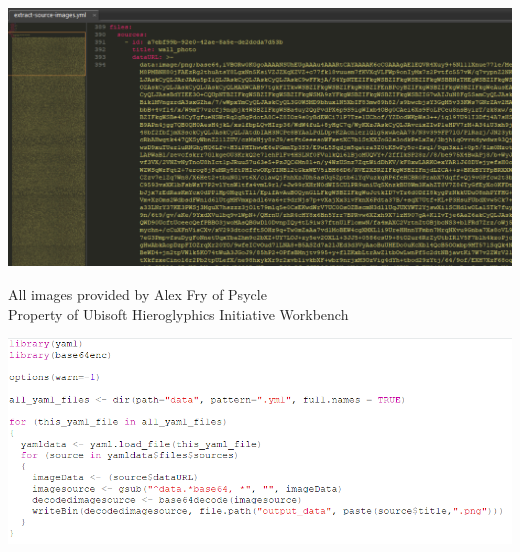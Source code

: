 \documentclass[unknownkeysallowed,usepdftitle=false, parskip=full]{beamer}
\newcommand{\secvariable}{nothing}
\newcommand{\mysection}[1]{\renewcommand{\secvariable}{#1}
}
\begin{document}
\begin{frame}\label{\secvariable} %

\begin{center}

\includegraphics[width=1\textwidth,keepaspectratio]{figure/sublime_1.png}
\end{center}
\vfill
\parbox{\linewidth}{\tiny All images provided by Alex Fry of Psycle
\\Property of Ubisoft Hieroglyphics Initiative Workbench}

\end{frame}

\mysection{slab}
\begin{frame}\label{\secvariable}

\begin{center}
\includegraphics[width=1\textwidth,keepaspectratio]{figure/EXCRACT.PNG}
\end{center}

\end{frame}



\end{document}
